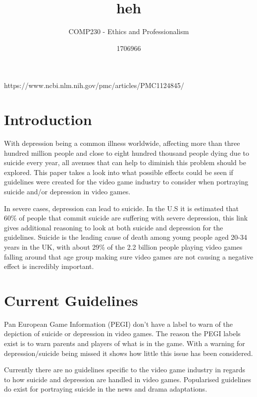 \documentclass{scrartcl}
\title{heh}
\subtitle{COMP230 - Ethics and Professionalism}
\author{1706966}
\begin{document}
	
https://www.ncbi.nlm.nih.gov/pmc/articles/PMC1124845/	
	
	\maketitle
	
	\abstract{}
	
	\section{Introduction}
		With depression being a common illness worldwide, affecting more than three hundred million people and close to eight hundred thousand people dying due to suicide every year\cite{DepressionStats}, all avenues that can help to diminish this problem should be explored. This paper takes a look into what possible effects could be seen if guidelines were created for the video game industry to consider when portraying suicide and/or depression in video games.
		
		In severe cases, depression can lead to suicide. In the U.S it is estimated that 60\% of people that commit suicide are suffering with severe depression\cite{SuicideToDepression}, this link gives additional reasoning to look at both suicide and depression for the guidelines. Suicide is the leading cause of death among young people aged 20-34 years in the UK\cite{youngAge}, with about 29\%\cite{sales2018essential} of the 2.2 billion\cite{globalGame} people playing video games falling around that age group making sure video games are not causing a negative effect is incredibly important.
	
	\section{Current Guidelines}
	Pan European Game Information (PEGI) don't have a label to warn of the depiction of suicide or depression in video games\cite{pegiNoRating}. The reason the PEGI labels exist is to warn parents and players of what is in the game. With a warning for depression/suicide being missed it shows how little this issue has been considered.\vspace{5mm} %
	
	Currently there are no guidelines specific to the video game industry in regards to how suicide and depression are handled in video games. Popularised guidelines do exist for portraying suicide in the news\cite{world2017preventing}\cite{nepon2009media} and drama adaptations\cite{DramaGuidelines}. \vspace{5mm} %
	
\end{document}
